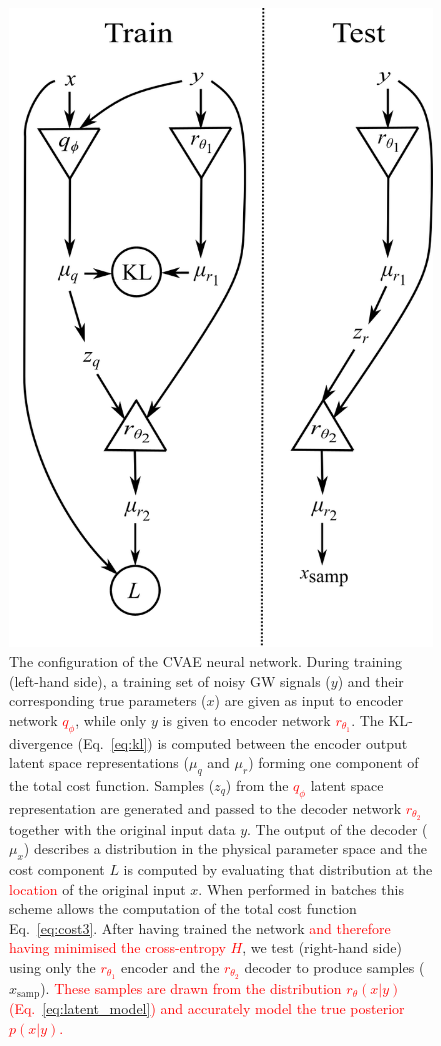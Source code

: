 \documentclass[%
showpacs,
nofootinbib,
 amsmath,amssymb,
 aps,
 twocolumn,
 prl,
 reprint,
floatfix,
]{revtex4-1}
\newcommand{\new}[1]{\textcolor{red}{#1}}
\begin{document}
\begin{figure}
    \includegraphics[width=0.95\columnwidth]{network_setup.png}
    \caption{\label{fig:network_config} The configuration of the \ac{CVAE}
neural network. During training (left-hand side), a training set of noisy
\ac{GW} signals ($y$) and their corresponding true parameters ($x$) are given
as input to encoder network \new{$q_{\phi}$}, while only $y$ is given to
encoder network \new{$r_{\theta_1}$}. The \ac{KL}-divergence (Eq.~\ref{eq:kl})
is computed between the encoder output latent space representations
($\mu_q$ and $\mu_r$) forming one component of the total cost function. Samples
($z_q$) from the \new{$q_{\phi}$} latent space representation are generated and
passed to the decoder network \new{$r_{\theta_2}$} together with the original
input data $y$. The output of the decoder ($\mu_x$) describes a distribution in
the physical parameter space and the cost component $L$ is computed by
evaluating that distribution at the \new{location} of the original input $x$.
When performed in batches this scheme allows the computation of the total cost
function Eq.~\ref{eq:cost3}. After having trained the network \new{and
therefore having minimised the cross-entropy $H$}, we test (right-hand side)
using only the \new{$r_{\theta_1}$} encoder and the \new{$r_{\theta_2}$}
decoder to produce samples ($x_{\text{samp}}$). \new{These samples are drawn
from the distribution $r_{\theta}(x|y)$ (Eq.~\ref{eq:latent_model})
and accurately model the true posterior $p(x|y)$.}}
\end{figure}
\end{document}
